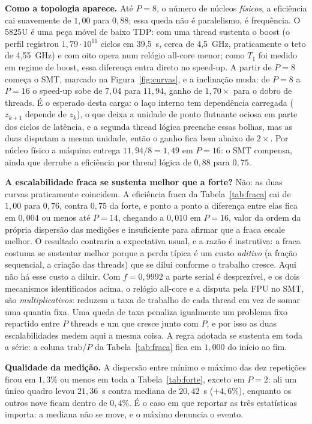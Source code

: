 \documentclass[10pt,a4paper]{article}
\begin{document}
\textbf{Como a topologia aparece.} Até $P=8$, o número de núcleos \emph{físicos}, a eficiência cai suavemente de $1{,}00$ para $0{,}88$; essa queda não é paralelismo, é frequência. O 5825U é uma peça móvel de baixo TDP: com uma thread sustenta o boost (o perfil registrou $1{,}79\cdot10^{11}$ ciclos em 39{,}5~s, cerca de 4{,}5~GHz, praticamente o teto de 4{,}55~GHz) e com oito opera num relógio all-core menor; como $T_1$ foi medido em regime de boost, essa diferença entra direto no speed-up. A partir de $P=8$ começa o SMT, marcado na Figura~\ref{fig:curvas}, e a inclinação muda: de $P=8$ a $P=16$ o speed-up sobe de $7{,}04$ para $11{,}94$, ganho de $1{,}70\times$ para o dobro de threads. É o esperado desta carga: o laço interno tem dependência carregada ($z_{k+1}$ depende de $z_k$), o que deixa a unidade de ponto flutuante ociosa em parte dos ciclos de latência, e a segunda thread lógica preenche essas bolhas, mas as duas disputam a mesma unidade, então o ganho fica bem abaixo de $2\times$. Por núcleo físico a máquina entrega $11{,}94/8=1{,}49$ em $P=16$: o SMT compensa, ainda que derrube a eficiência por thread lógica de $0{,}88$ para $0{,}75$.

\textbf{A escalabilidade fraca se sustenta melhor que a forte?} Não: as duas curvas praticamente coincidem. A eficiência fraca da Tabela~\ref{tab:fraca} cai de $1{,}00$ para $0{,}76$, contra $0{,}75$ da forte, e ponto a ponto a diferença entre elas fica em $0{,}004$ ou menos até $P=14$, chegando a $0{,}010$ em $P=16$, valor da ordem da própria dispersão das medições e insuficiente para afirmar que a fraca escale melhor. O resultado contraria a expectativa usual, e a razão é instrutiva: a fraca costuma se sustentar melhor porque a perda típica é um custo \emph{aditivo} (a fração sequencial, a criação das threads) que se dilui conforme o trabalho cresce. Aqui não há esse custo a diluir. Com $f=0{,}9992$ a parte serial é desprezível, e os dois mecanismos identificados acima, o relógio all-core e a disputa pela FPU no SMT, são \emph{multiplicativos}: reduzem a taxa de trabalho de cada thread em vez de somar uma quantia fixa. Uma queda de taxa penaliza igualmente um problema fixo repartido entre $P$ threads e um que cresce junto com $P$, e por isso as duas escalabilidades medem aqui a mesma coisa. A regra adotada se sustenta em toda a série: a coluna trab/$P$ da Tabela~\ref{tab:fraca} fica em $1{,}000$ do início ao fim.

\textbf{Qualidade da medição.} A dispersão entre mínimo e máximo das dez repetições ficou em $1{,}3\%$ ou menos em toda a Tabela~\ref{tab:forte}, exceto em $P=2$: ali um único quadro levou $21{,}36$~s contra mediana de $20{,}42$~s ($+4{,}6\%$), enquanto os outros nove ficam dentro de $0{,}4\%$. É o caso em que reportar as três estatísticas importa: a mediana não se move, e o máximo denuncia o evento.
\end{document}
